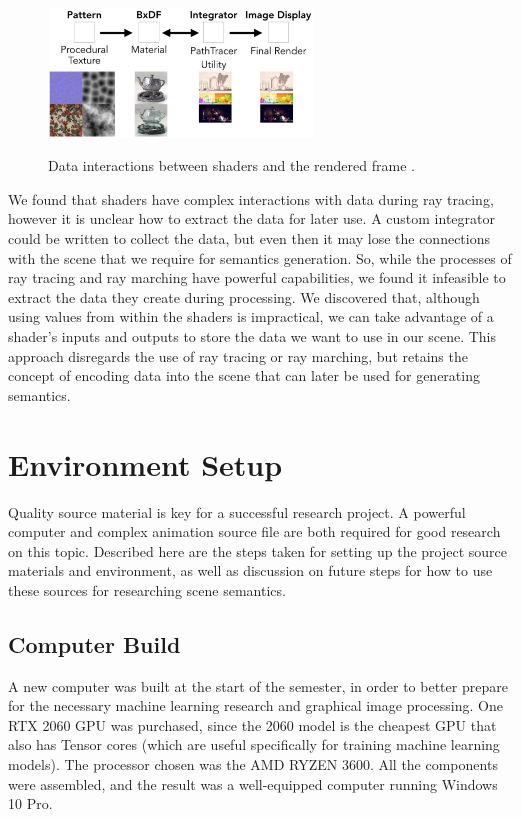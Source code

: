 \documentclass[conference]{IEEEtran}
\begin{document}
\begin{figure}[htbp]
\centering
{\includegraphics[width=7cm]{interaction.png}}
\caption{Data interactions between shaders and the rendered frame  \cite{renderman}.}
\label{fig:interaction}
\end{figure}

We found that shaders have complex interactions with data during ray tracing,
however it is unclear how to extract the data for later use.
A custom integrator could be written to collect the data, but even then it
may lose the connections with the scene that we require for semantics generation.
So, while the processes of ray tracing and ray marching have powerful capabilities,
we found it infeasible to extract the data they create during processing.
We discovered that, although using values from within the shaders is impractical,
we can take advantage of a shader's inputs and outputs to store the data we want to
use in our scene.
This approach disregards the use of ray tracing or ray marching,
but retains the concept of encoding data into the scene that can later be used
for generating semantics.

\section{Environment Setup}
Quality source material is key for a successful research project.
A powerful computer and complex animation source file are both required
for good research on this topic.
Described here are the steps taken for setting up the project
source materials and environment, as well as discussion on future steps
for how to use these sources for researching scene semantics.

\subsection{Computer Build}
A new computer was built at the start of the semester, in order to better prepare for the necessary machine learning
research and graphical image processing. One RTX 2060 GPU was purchased,
since the 2060 model is the cheapest GPU that also has Tensor cores
(which are useful specifically for training machine learning models).
The processor chosen was the AMD RYZEN 3600.
All the components were assembled,
and the result was a well-equipped computer running Windows 10 Pro.
\end{document}
